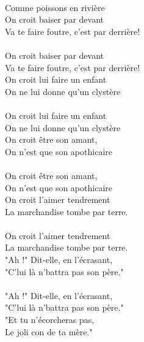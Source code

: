 {\\Comme poissons en rivière
\\On croit baiser par devant
\\Va te faire foutre, c'est par derrière!
\\\\On croit baiser par devant
\\Va te faire foutre, c'est par derrière!
\\On croit lui faire un enfant
\\On ne lui donne qu'un clystère
\\\\On croit lui faire un enfant
\\On ne lui donne qu'un clystère
\\On croit être son amant,
\\On n'est que son apothicaire
\\\\On croit être son amant,
\\On n'est que son apothicaire
\\On croit l'aimer tendrement
\\La marchandise tombe par terre.
\\\\On croit l'aimer tendrement
\\La marchandise tombe par terre.
\\"Ah !" Dit-elle, en l’écrasant,
\\"C’lui là n’battra pas son père."
\\\\"Ah !" Dit-elle, en l’écrasant,
\\"C’lui là n’battra pas son père."
\\"Et tu n’écorcheras pas,
\\Le joli con de ta mère."
}

\breakpage